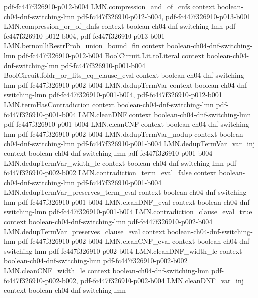 \begin{theorem}
  {pdf-fc447f326910-p012-b004}
\proofstep
  {LMN.compression_and_of_cnfs}
  {context}
  {boolean-ch04-dnf-switching-lmn}
  {pdf-fc447f326910-p012-b004,
    pdf-fc447f326910-p013-b001}
\proofstep
  {LMN.compression_or_of_dnfs}
  {context}
  {boolean-ch04-dnf-switching-lmn}
  {pdf-fc447f326910-p012-b004,
    pdf-fc447f326910-p013-b001}
\proofstep
  {LMN.bernoulliRestrProb_union_bound_fin}
  {context}
  {boolean-ch04-dnf-switching-lmn}
  {pdf-fc447f326910-p012-b004}
\proofstep
  {BoolCircuit.Lit.toLiteral}
  {context}
  {boolean-ch04-dnf-switching-lmn}
  {pdf-fc447f326910-p001-b004}
\proofstep
  {BoolCircuit.foldr_or_lits_eq_clause_eval}
  {context}
  {boolean-ch04-dnf-switching-lmn}
  {pdf-fc447f326910-p002-b004}
\proofstep
  {LMN.dedupTermVar}
  {context}
  {boolean-ch04-dnf-switching-lmn}
  {pdf-fc447f326910-p001-b004,
    pdf-fc447f326910-p012-b001}
\proofstep
  {LMN.termHasContradiction}
  {context}
  {boolean-ch04-dnf-switching-lmn}
  {pdf-fc447f326910-p001-b004}
\proofstep
  {LMN.cleanDNF}
  {context}
  {boolean-ch04-dnf-switching-lmn}
  {pdf-fc447f326910-p001-b004}
\proofstep
  {LMN.cleanCNF}
  {context}
  {boolean-ch04-dnf-switching-lmn}
  {pdf-fc447f326910-p002-b004}
\proofstep
  {LMN.dedupTermVar_nodup}
  {context}
  {boolean-ch04-dnf-switching-lmn}
  {pdf-fc447f326910-p001-b004}
\proofstep
  {LMN.dedupTermVar_var_inj}
  {context}
  {boolean-ch04-dnf-switching-lmn}
  {pdf-fc447f326910-p001-b004}
\proofstep
  {LMN.dedupTermVar_width_le}
  {context}
  {boolean-ch04-dnf-switching-lmn}
  {pdf-fc447f326910-p002-b002}
\proofstep
  {LMN.contradiction_term_eval_false}
  {context}
  {boolean-ch04-dnf-switching-lmn}
  {pdf-fc447f326910-p001-b004}
\proofstep
  {LMN.dedupTermVar_preserves_term_eval}
  {context}
  {boolean-ch04-dnf-switching-lmn}
  {pdf-fc447f326910-p001-b004}
\proofstep
  {LMN.cleanDNF_eval}
  {context}
  {boolean-ch04-dnf-switching-lmn}
  {pdf-fc447f326910-p001-b004}
\proofstep
  {LMN.contradiction_clause_eval_true}
  {context}
  {boolean-ch04-dnf-switching-lmn}
  {pdf-fc447f326910-p002-b004}
\proofstep
  {LMN.dedupTermVar_preserves_clause_eval}
  {context}
  {boolean-ch04-dnf-switching-lmn}
  {pdf-fc447f326910-p002-b004}
\proofstep
  {LMN.cleanCNF_eval}
  {context}
  {boolean-ch04-dnf-switching-lmn}
  {pdf-fc447f326910-p002-b004}
\proofstep
  {LMN.cleanDNF_width_le}
  {context}
  {boolean-ch04-dnf-switching-lmn}
  {pdf-fc447f326910-p002-b002}
\proofstep
  {LMN.cleanCNF_width_le}
  {context}
  {boolean-ch04-dnf-switching-lmn}
  {pdf-fc447f326910-p002-b002,
    pdf-fc447f326910-p002-b004}
\proofstep
  {LMN.cleanDNF_var_inj}
  {context}
  {boolean-ch04-dnf-switching-lmn}

\end{theorem}
